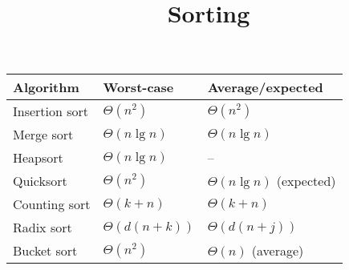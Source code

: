 \documentclass[a4paper,11pt]{article}
\title{Sorting}
\begin{document}
\begin{tabular}{l | l l}
	Algorithm & Worst-case & Average\slash expected \\
	\hline
	Insertion sort & $\Theta(n^2)$ & $\Theta(n^2)$ \\
	Merge sort & $\Theta(n \lg n)$ & $\Theta(n \lg n)$ \\
	Heapsort & $\Theta(n \lg n)$ & -- \\
	Quicksort & $\Theta(n^2)$ & $\Theta(n \lg n)$ (expected) \\
	Counting sort & $\Theta(k + n)$ & $\Theta(k + n)$ \\
	Radix sort & $\Theta(d(n + k))$ & $\Theta(d(n + j))$ \\
	Bucket sort & $\Theta(n^2)$ & $\Theta(n)$ (average) \\

\end{tabular}
\end{document}
